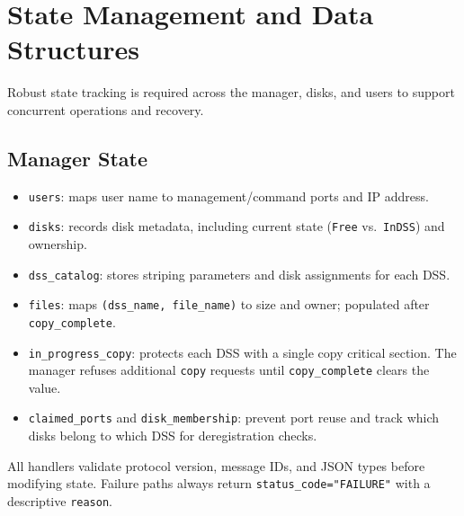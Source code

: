 \documentclass[11pt]{article}
\begin{document}
\section{State Management and Data Structures}
Robust state tracking is required across the manager, disks, and users to support concurrent operations and recovery.

\subsection{Manager State}
\begin{itemize}
  \item \texttt{users}: maps user name to management/command ports and IP address.
  \item \texttt{disks}: records disk metadata, including current state (\texttt{Free} vs.~\texttt{InDSS}) and ownership.
  \item \texttt{dss\_catalog}: stores striping parameters and disk assignments for each DSS.
  \item \texttt{files}: maps \texttt{(dss\_name, file\_name)} to size and owner; populated after \texttt{copy\_complete}.
  \item \texttt{in\_progress\_copy}: protects each DSS with a single copy critical section. The manager refuses additional \texttt{copy} requests until \texttt{copy\_complete} clears the value.
  \item \texttt{claimed\_ports} and \texttt{disk\_membership}: prevent port reuse and track which disks belong to which DSS for deregistration checks.
\end{itemize}
All handlers validate protocol version, message IDs, and JSON types before modifying state. Failure paths always return \texttt{status\_code="FAILURE"} with a descriptive \texttt{reason}.
\end{document}
